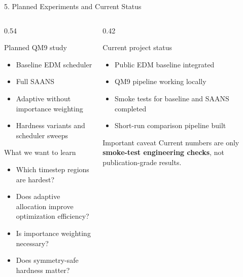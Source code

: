 \documentclass[aspectratio=169,11pt]{beamer}
\begin{document}
\begin{frame}{5. Planned Experiments and Current Status}
\small
\begin{columns}[T]
    \begin{column}{0.54\textwidth}
        \begin{block}{Planned QM9 study}
        \begin{itemize}
            \item Baseline EDM scheduler
            \item Full SAANS
            \item Adaptive without importance weighting
            \item Hardness variants and scheduler sweeps
        \end{itemize}
        \end{block}

        \begin{block}{What we want to learn}
        \begin{itemize}
            \item Which timestep regions are hardest?
            \item Does adaptive allocation improve optimization efficiency?
            \item Is importance weighting necessary?
            \item Does symmetry-safe hardness matter?
        \end{itemize}
        \end{block}
    \end{column}
    \begin{column}{0.42\textwidth}
        \begin{block}{Current project status}
        \begin{itemize}
            \item Public EDM baseline integrated
            \item QM9 pipeline working locally
            \item Smoke tests for baseline and SAANS completed
            \item Short-run comparison pipeline built
        \end{itemize}
        \end{block}

        \begin{alertblock}{Important caveat}
        Current numbers are only \textbf{smoke-test engineering checks}, not publication-grade results.
        \end{alertblock}
    \end{column}
\end{columns}
\end{frame}
\end{document}
